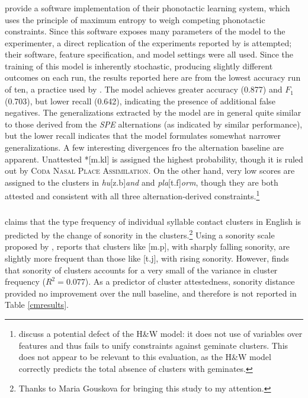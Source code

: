 \subsubsection{\citet{Hayes2008a}}

\citet{Hayes2008a} provide a software implementation of their phonotactic learning system, which uses the principle of maximum entropy to weigh competing phonotactic constraints. Since this software exposes many parameters of the model to the experimenter, a direct replication of the experiments reported by \citeauthor{Hayes2008a} is attempted; their software, feature specification, and model settings were all used. Since the training of this model is inherently stochastic, producing slightly different outcomes on each run, the results reported here are from the lowest accuracy run of ten, a practice used by \citeauthor{Hayes2008a}. The model achieves greater accuracy (0.877) and $F_1$ (0.703), but lower recall (0.642), indicating the presence of additional false negatives. The generalizations extracted by the \citeauthor{Hayes2008a} model are in general quite similar to those derived from the \emph{SPE} alternations (as indicated by similar performance), but the lower recall indicates that the model formulates somewhat narrower generalizations. A few interesting divergences fro the alternation baseline are apparent. Unattested *[m.kl] is assigned the highest probability, though it is ruled out by \textsc{Coda Nasal Place Assimilation}. On the other hand, very low scores are assigned to the clusters in \emph{hu}[z.b]\emph{and} and \emph{pla}[t.f]\emph{orm}, though they are both attested and consistent with all three alternation-derived constraints.\footnote{\citet{Berent2012} discuss a potential defect of the H\&W model: it does not use of variables over features and thus fails to unify constraints against geminate clusters. This does not appear to be relevant to this evaluation, as the H\&W model correctly predicts the total absence of clusters with geminates.}

\subsubsection{\citet{McGowan2009}}

\citet{McGowan2009} claims that the type frequency of individual syllable contact clusters in English is predicted by the change of sonority in the clusters.\footnote{Thanks to Maria Gouskova for bringing this study to my attention.} Using a sonority scale proposed by \citet{Jespersen1904}, \citeauthor{McGowan2009} reports that clusters like [m.p], with sharply falling sonority, are slightly more frequent than those like [t.j], with rising sonority. However, \citeauthor{McGowan2009} finds that sonority of clusters accounts for a very small of the variance in cluster frequency ($R^2 = 0.077$). As a predictor of cluster attestedness, sonority distance provided no improvement over the null baseline, and therefore is not reported in Table \ref{cmresults}.


